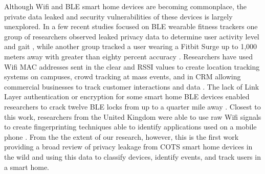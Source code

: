 Although Wifi and \ac{BLE} smart home devices are becoming commonplace, the private data leaked and security vulnerabilities of these devices is largely unexplored. In a few recent studies focused on \ac{BLE} wearable fitness trackers one group of researchers observed leaked privacy data to determine user activity level and gait \cite{Das}, while another group tracked a user wearing a Fitbit Surge up to 1,000 meters away with greater than eighty percent accuracy \cite{RoseTrack}. Researchers have used Wifi \ac{MAC} addresses sent in the clear and \ac{RSSI} values to create location tracking systems on campuses, crowd tracking at mass events, and in \ac{CRM} allowing commercial businesses to track customer interactions and data \cite{Zhou}\cite{Bonne}\cite{Atkinson}. The lack of Link Layer authentication or encryption for some smart home \ac{BLE} devices enabled researchers to crack twelve \ac{BLE} locks from up to a quarter mile away \cite{RoseLocks}. Closest to this work, researchers from the United Kingdom were able to use raw Wifi signals to create fingerprinting techniques able to identify applications used on a mobile phone \cite{Atkinson}. From the the extent of our research, however, this is the first work providing a broad review of privacy leakage from \ac{COTS} smart home devices in the wild and using this data to classify devices, identify events, and track users in a smart home.